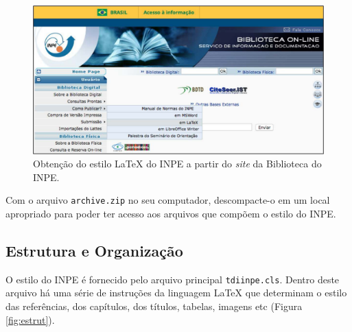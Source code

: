 
\begin{figure}[H]
\caption{Obtenção do estilo \LaTeX{} do INPE a partir do \textit{site} da Biblioteca do INPE.}
\vspace{6mm}
    \begin{center}
        \includegraphics[scale=0.3]{./docs/figs/biblio_pub_latex.pdf}
    \end{center}
\vspace{4mm}
\label{fig:biblio_pub_latex}
\end{figure}

Com o arquivo {\tt archive.zip} no seu computador, descompacte-o em um local apropriado para poder ter acesso aos arquivos que compõem o estilo do INPE.


\subsection{Estrutura e Organização}
\label{sec:estrut}

O estilo do INPE é fornecido pelo arquivo principal {\tt tdiinpe.cls}. Dentro deste arquivo há uma série de instruções da linguagem \LaTeX{} que determinam o estilo das referências, dos capítulos, dos títulos, tabelas, imagens etc (Figura \ref{fig:estrut}).

